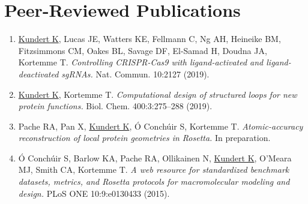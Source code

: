 \section{Peer-Reviewed Publications}

\begin{enumerate}

\item \underline{Kundert K}, Lucas JE, Watters KE, Fellmann C, Ng AH, Heineike 
    BM, Fitzsimmons CM, Oakes BL, Savage DF, El-Samad H, Doudna JA, Kortemme T.  
        \emph{Controlling CRISPR-Cas9 with ligand-activated and 
        ligand-deactivated sgRNAs.}  Nat. Commun. 10:2127 (2019).

\item \underline{Kundert K}, Kortemme T.  \emph{Computational design of 
  structured loops for new protein functions.}  Biol. Chem. 400:3:275--288 
  (2019).

\item Pache RA, Pan X, \underline{Kundert K}, Ó Conchúir S, Kortemme T.  
    \emph{Atomic-accuracy reconstruction of local protein geometries in 
        Rosetta.}  In preparation.

\item Ó Conchúir S, Barlow KA, Pache RA, Ollikainen N, \underline{Kundert K}, 
    O'Meara MJ, Smith CA, Kortemme T.  \emph{A web resource for standardized 
        benchmark datasets, metrics, and Rosetta protocols for macromolecular 
        modeling and design.}  PLoS ONE 10:9:e0130433 (2015).

\end{enumerate}


